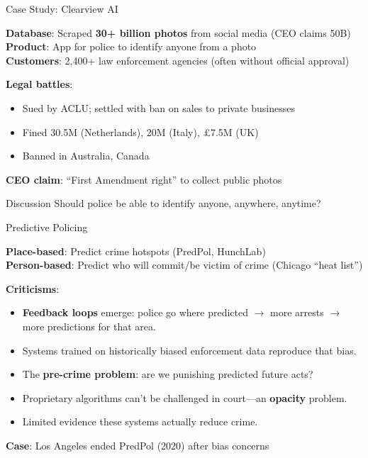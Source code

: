 ﻿\documentclass[aspectratio=169,11pt]{beamer}
\begin{document}
\begin{frame}{Case Study: Clearview AI}
\begin{casestudybox}
\small
\textbf{Database}: Scraped \textbf{30+ billion photos} from social media (CEO claims 50B)\\
\textbf{Product}: App for police to identify anyone from a photo\\
\textbf{Customers}: 2,400+ law enforcement agencies (often without official approval)
\end{casestudybox}

\vspace{0.2em}
\textbf{Legal battles}:
\begin{itemize}
    \item Sued by ACLU; settled with ban on sales to private businesses
    \item Fined \texteuro30.5M (Netherlands), \texteuro20M (Italy), \pounds7.5M (UK)
    \item Banned in Australia, Canada
\end{itemize}

\textbf{CEO claim}: ``First Amendment right'' to collect public photos

\begin{alertblock}{Discussion}
Should police be able to identify anyone, anywhere, anytime?
\end{alertblock}
\end{frame}

\begin{frame}{Predictive Policing}
\begin{conceptbox}
\small
\textbf{Place-based}: Predict crime hotspots (PredPol, HunchLab)\\
\textbf{Person-based}: Predict who will commit/be victim of crime (Chicago ``heat list'')
\end{conceptbox}

\vspace{0.3em}
\textbf{Criticisms}:
\begin{itemize}
    \item \textbf{Feedback loops} emerge: police go where predicted $\rightarrow$ more arrests $\rightarrow$ more predictions for that area.
    \item Systems trained on historically biased enforcement data reproduce that bias.
    \item The \textbf{pre-crime problem}: are we punishing predicted future acts?
    \item Proprietary algorithms can't be challenged in court---an \textbf{opacity} problem.
    \item Limited evidence these systems actually reduce crime.
\end{itemize}

\textbf{Case}: Los Angeles ended PredPol (2020) after bias concerns
\end{frame}
\end{document}
